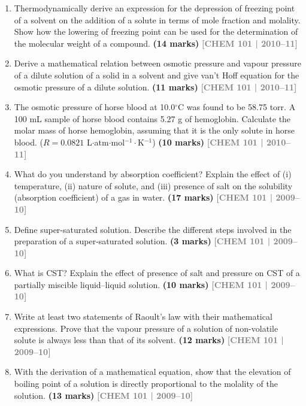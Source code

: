 \documentclass[12pt,a3paper]{article}
\newcommand{\yr}[1]{\hfill\textcolor{gray}{\small\textbf{[#1]}}}
\newcommand{\mk}[1]{\textcolor{orange!70!black}{\small\textbf{(#1 marks)}}}
\begin{document}
\begin{enumerate}
\item Thermodynamically derive an expression for the depression of freezing point of a solvent on the addition of a solute in terms of mole fraction and molality. Show how the lowering of freezing point can be used for the determination of the molecular weight of a compound. \mk{14}
\yr{CHEM 101 | 2010--11}



\item Derive a mathematical relation between osmotic pressure and vapour pressure of a dilute solution of a solid in a solvent and give van't Hoff equation for the osmotic pressure of a dilute solution. \mk{11}
\yr{CHEM 101 | 2010--11}



\item The osmotic pressure of horse blood at 10.0$^\circ$C was found to be 58.75 torr. A 100 mL sample of horse blood contains 5.27 g of hemoglobin. Calculate the molar mass of horse hemoglobin, assuming that it is the only solute in horse blood. ($R = 0.0821$ L$\cdot$atm$\cdot$mol$^{-1}\cdot$K$^{-1}$) \mk{10}
\yr{CHEM 101 | 2010--11}



\item What do you understand by absorption coefficient? Explain the effect of (i) temperature, (ii) nature of solute, and (iii) presence of salt on the solubility (absorption coefficient) of a gas in water. \mk{17}
\yr{CHEM 101 | 2009--10}



\item Define super-saturated solution. Describe the different steps involved in the preparation of a super-saturated solution. \mk{3}
\yr{CHEM 101 | 2009--10}



\item What is CST? Explain the effect of presence of salt and pressure on CST of a partially miscible liquid--liquid solution. \mk{10}
\yr{CHEM 101 | 2009--10}



\item Write at least two statements of Raoult's law with their mathematical expressions. Prove that the vapour pressure of a solution of non-volatile solute is always less than that of its solvent. \mk{12}
\yr{CHEM 101 | 2009--10}



\item With the derivation of a mathematical equation, show that the elevation of boiling point of a solution is directly proportional to the molality of the solution. \mk{13}
\yr{CHEM 101 | 2009--10}




\end{enumerate}
\end{document}

